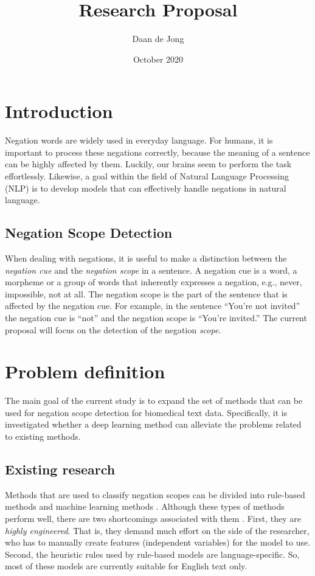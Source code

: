 \documentclass{article}
\title{Research Proposal}
\author{Daan de Jong}
\date{October 2020}
\begin{document}


\pagestyle{fancy}

\section{Introduction}
Negation words are widely used in everyday language. For humans, it is important to process these negations correctly, because the meaning of a sentence can be highly affected by them. Luckily, our brains seem to perform the task effortlessly. Likewise, a goal within the field of Natural Language Processing (NLP) is to develop models that can effectively handle negations in natural language.

\subsection{Negation Scope Detection}
When dealing with negations, it is useful to make a distinction between the \textit{negation cue} and the \textit{negation scope} in a sentence. A negation cue is a word, a morpheme or a group of words that inherently expresses a negation, e.g., never, impossible, not at all. The negation scope is the part of the sentence that is affected by the negation cue. For example, in the sentence ``You're not invited'' the negation cue is ``not'' and the negation scope is ``You’re invited.'' The current proposal will focus on the detection of the negation \textit{scope}. 

\section{Problem definition}
The main goal of the current study is to expand the set of methods that can be used for negation scope detection for biomedical text data. Specifically, it is investigated whether a deep learning method can alleviate the problems related to existing methods. 

\subsection{Existing research} \label{problems}
Methods that are used to classify negation scopes can be divided into rule-based methods \citep[e.g.,][]{basile2012ugroningen} and machine learning methods \citep[e.g.,][]{fei2020negation}. Although these types of methods perform well, there are two shortcomings associated with them \cite{fancellu2016neural}. First, they are \textit{highly engineered}. That is, they demand much effort on the side of the researcher, who has to manually create features (independent variables) for the model to use. Second, the heuristic rules used by rule-based models are language-specific. So, most of these models are currently suitable for English text only.
\end{document}
